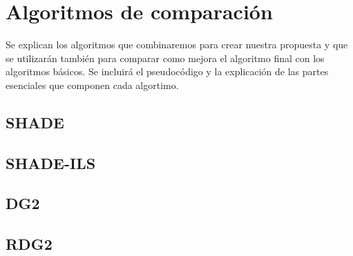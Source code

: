 
\chapter{Algoritmos de comparación}

Se explican los algoritmos que combinaremos para crear nuestra propuesta y que se utilizarán también para comparar como mejora el algoritmo final con los algoritmos básicos. Se incluirá el pseudocódigo y la explicación de las partes esenciales que componen cada algortimo.

\section{SHADE}

\section{SHADE-ILS}

\section{DG2}

\section{RDG2}

\endinput
